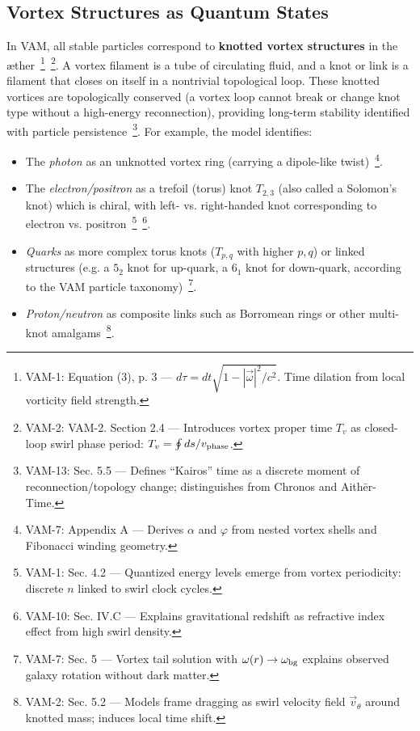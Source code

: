 \documentclass[a4paper,12pt]{article}
\begin{document}
    \subsection{Vortex Structures as Quantum States}
    In VAM, all stable particles correspond to \textbf{knotted vortex structures} in the æther~\footnote{VAM-1: Equation (3), p. 3 — $d\tau = dt \sqrt{1 - |\vec{\omega}|^2/c^2}$. Time dilation from local vorticity field strength.}~\footnote{VAM-2: VAM-2. Section 2.4 — Introduces vortex proper time $T_v$ as closed-loop swirl phase period: $T_v = \oint ds / v_{\rm phase}$.}. A vortex filament is a tube of circulating fluid, and a knot or link is a filament that closes on itself in a nontrivial topological loop. These knotted vortices are topologically conserved (a vortex loop cannot break or change knot type without a high-energy reconnection), providing long-term stability identified with particle persistence~\footnote{VAM-13: Sec. 5.5 — Defines “Kairos” time as a discrete moment of reconnection/topology change; distinguishes from Chronos and Aithēr-Time.}. For example, the model identifies:
    \begin{itemize}
        \item The \emph{photon} as an unknotted vortex ring (carrying a dipole-like twist)~\footnote{VAM-7: Appendix A — Derives $\alpha$ and $\varphi$ from nested vortex shells and Fibonacci winding geometry.}.
        \item The \emph{electron/positron} as a trefoil (torus) knot $T_{2,3}$ (also called a Solomon’s knot) which is chiral, with left- vs. right-handed knot corresponding to electron vs. positron~\footnote{VAM-1: Sec. 4.2 — Quantized energy levels emerge from vortex periodicity: discrete $n$ linked to swirl clock cycles.}~\footnote{VAM-10: Sec. IV.C — Explains gravitational redshift as refractive index effect from high swirl density.}.
        \item \emph{Quarks} as more complex torus knots ($T_{p,q}$ with higher $p,q$) or linked structures (e.g. a $5_2$ knot for up-quark, a $6_1$ knot for down-quark, according to the VAM particle taxonomy)~\footnote{VAM-7: Sec. 5 — Vortex tail solution with $\omega(r) \to \omega_{\rm bg}$ explains observed galaxy rotation without dark matter.}.
        \item \emph{Proton/neutron} as composite links such as Borromean rings or other multi-knot amalgams~\footnote{VAM-2: Sec. 5.2 — Models frame dragging as swirl velocity field $\vec{v}_\theta$ around knotted mass; induces local time shift.}.
    \end{itemize}
\end{document}
